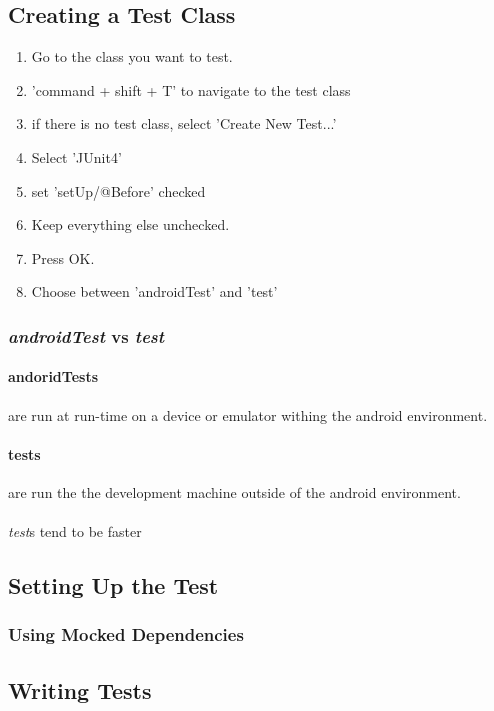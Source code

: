 \documentclass[]{article}
\begin{document}
\subsection{Creating a Test Class}
\begin{enumerate}
	\item Go to the class you want to test.
	\item 'command + shift + T' to navigate to the test class
	\item if there is no test class, select 'Create New Test...'
	\item Select 'JUnit4'
	\item set 'setUp/@Before' checked
	\item Keep everything else unchecked.
	\item Press OK.
	\item Choose between 'androidTest' and 'test'
\end{enumerate}
\subsubsection{\textit{androidTest} vs \textit{test}}
\paragraph{andoridTests} are run at run-time on a device or emulator withing the android environment.
\paragraph{tests} are run the the development machine outside of the android environment.
\\\\
\textit{test}s tend to be faster

\subsection{Setting Up the Test}

\subsubsection{Using Mocked Dependencies}

\subsection{Writing Tests}

\end{document}
